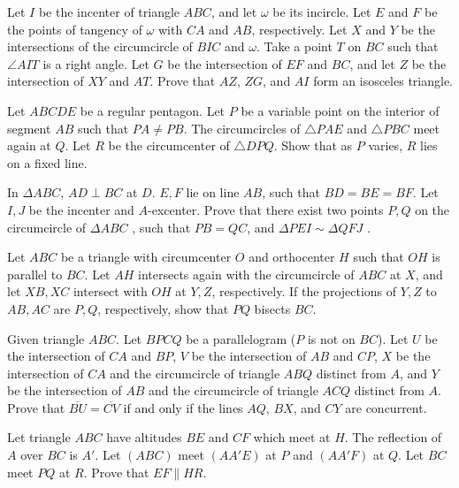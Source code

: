 \documentclass[11pt]{scrartcl}
\begin{document}
\begin{problem}[651490142085731]
	Let $I$ be the incenter of triangle $ABC$, and let $\omega$ be its incircle. Let $E$ and $F$ be the points of tangency of $\omega$ with $CA$ and $AB$, respectively. Let $X$ and $Y$ be the intersections of the circumcircle of $BIC$ and $\omega$. Take a point $T$ on $BC$ such that $\angle AIT$ is a right angle. Let $G$ be the intersection of $EF$ and $BC$, and let $Z$ be the intersection of $XY$ and $AT$. Prove that $AZ$, $ZG$, and $AI$ form an isosceles triangle.
\end{problem}
\begin{problem}[6020628633767269011]
Let \(ABCDE\) be a regular pentagon. Let \(P\) be a variable point on the interior of segment \(AB\) such that \(PA\ne PB\). The circumcircles of \(\triangle PAE\) and \(\triangle PBC\) meet again at \(Q\). Let \(R\) be the circumcenter of \(\triangle DPQ\). Show that as \(P\) varies, \(R\) lies on a fixed line.
\end{problem}
\begin{problem}[8402748184217471405]
In $\Delta ABC$, $AD \perp BC$ at $D$. $E,F$ lie on line $AB$, such that $BD=BE=BF$. Let $I,J$ be the incenter and $A$-excenter. Prove that there exist two points $P,Q$ on the circumcircle of $\Delta ABC$ , such that $PB=QC$, and $\Delta PEI \sim \Delta QFJ$ .
\end{problem}
\begin{problem}[1427062131747349943]
Let $ABC$ be a triangle with circumcenter $O$ and orthocenter $H$ such that $OH$ is parallel to $BC$. Let $AH$ intersects again with the circumcircle of $ABC$ at $X$, and let $XB, XC$ intersect with $OH$ at $Y, Z$, respectively. If the projections of $Y,Z$ to $AB,AC$ are $P,Q$, respectively, show that $PQ$ bisects $BC$.
\end{problem}
\begin{problem}[302438226120877]
	Given triangle $ABC$. Let $BPCQ$ be a parallelogram ($P$ is not on $BC$). Let $U$ be the intersection of $CA$ and $BP$, $V$ be the intersection of $AB$ and $CP$, $X$ be the intersection of $CA$ and the circumcircle of triangle $ABQ$ distinct from $A$, and $Y$ be the intersection of $AB$ and the circumcircle of triangle $ACQ$ distinct from $A$.
Prove that $\overline{BU} = \overline{CV}$ if and only if the lines $AQ$, $BX$, and $CY$ are concurrent.
\end{problem}
\begin{problem}[210358073900610]
Let triangle $ABC$ have altitudes $BE$ and $CF$ which meet at $H$. The reflection of $A$ over $BC$ is $A'$. Let $(ABC)$ meet $(AA'E)$ at $P$ and $(AA'F)$ at $Q$. Let $BC$ meet $PQ$ at $R$. Prove that $EF \parallel HR$.
\end{problem}
\end{document}
